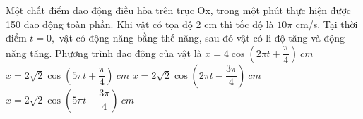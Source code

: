 \begin{ex}%
Một chất điểm dao động điều hòa trên trục Ox, trong một phút thực hiện được 150 dao động toàn phần. Khi vật có tọa độ 2 cm thì tốc độ là $10\pi$  cm/s. Tại thời điểm $t=0,$ vật có động năng bằng thế năng, sau đó vật có li độ tăng và động năng tăng. Phương trình dao động của vật là
\choice
{$x=4\cos  \left( 2\pi t+\dfrac{\pi}{4} \right)\ cm$}
{$x=2\sqrt{2}\cos  \left( 5\pi t+\dfrac{\pi}{4} \right)\ cm$}
{$x=2\sqrt{2}\cos  \left( 2\pi t-\dfrac{3\pi}{4} \right)\ cm$}
{\True $x=2\sqrt{2}\cos  \left( 5\pi t-\dfrac{3\pi}{4} \right)\ cm$}
\end{ex} 
































